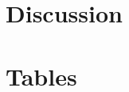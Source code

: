 \documentclass{article}
\begin{document}
\section{Discussion}


\newpage


\newpage
\section{Tables}

\begin{comment}
    
\begin{table}[h!]
\begin{centering}
\doublespacing
\caption{Summary Statistics}
\adjustbox{width=0.75\linewidth, center}{
    
}
\label{tab:sumstat}
\end{centering}
\begin{spacing}{1}
\begin{footnotesize}

\textit{Notes:} This table summarizes students’ math test scores, absence rate at the student and class levels, and the rate of chronic absenteeism at the student and class levels. We also summarize main student covariates using shares from 0 to 1.
\end{footnotesize}
\end{spacing}
\end{table}


\begin{table}[h]
\begin{centering}
\doublespacing
\caption{Math Scores Value Added, Evaluating Multi-Level Covariates}
\adjustbox{ width=\linewidth}{
     \label{tab:tcontrols}
}
\end{centering}
\begin{spacing}{1} \begin{footnotesize} \textit{Notes:} This table evaluates the effect of covariates at the student, class, teacher, and school level on the value added function for standardized math scores. Column 1 evaluates the effects of the absence rate (days absent/days enrolled) at the student level, the average classroom rate, and the average school level rate, with fixed effects at the grade-school year level. Column 2 focuses on the student rate and incorporates student covariates. Column 3 evaluates all independent variables from Column 1 and incorporates student, classroom, teacher, and school covariates. Column 4 incorporates school level fixed effects. Column 5 incorporates school-grade-year fixed effects. p $<$ 0.01 ***, p $<$ 0.05 **, p $<$0.1 *. 
\end{footnotesize} 
\end{spacing}
\end{table}



\end{comment}
\end{document}
